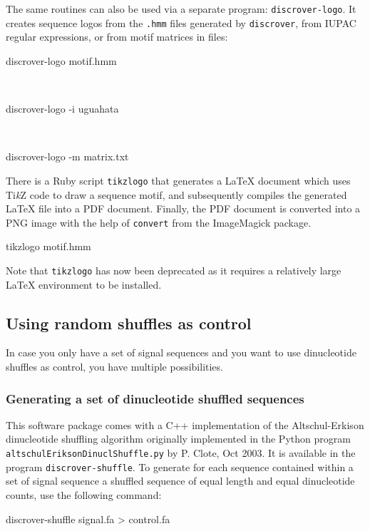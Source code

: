 \documentclass[a4paper]{article}
\newcommand{\dinuclshuffle}[0]{\texttt{discrover-shuffle}}
\newcommand{\TikZ}{Ti\emph{k}Z}
\begin{document}
The same routines can also be used via a separate program: \verb|discrover-logo|.
It creates sequence logos from the \verb|.hmm| files generated by \verb|discrover|, from IUPAC regular expressions, or from motif matrices in files:\\
\begin{verbbox}
discrover-logo motif.hmm
\end{verbbox}
\fbox{\theverbbox[t]}\\
\begin{verbbox}
discrover-logo -i uguahata
\end{verbbox}
\fbox{\theverbbox[t]}\\
\begin{verbbox}
discrover-logo -m matrix.txt
\end{verbbox}
\fbox{\theverbbox[t]}

There is a Ruby script \verb|tikzlogo| that generates a \LaTeX{} document which uses \TikZ{} code to draw a sequence motif, and subsequently compiles the generated \LaTeX{} file into a PDF document.
Finally, the PDF document is converted into a PNG image with the help of \verb|convert| from the ImageMagick package.\\
\begin{verbbox}
tikzlogo motif.hmm
\end{verbbox}
\fbox{\theverbbox[t]}

Note that \verb|tikzlogo| has now been deprecated as it requires a relatively large \LaTeX{} environment to be installed.

\subsection{Using random shuffles as control}
In case you only have a set of signal sequences and you want to use dinucleotide shuffles as control, you have multiple possibilities.
\subsubsection{Generating a set of dinucleotide shuffled sequences}
This software package comes with a C++ implementation of the Altschul-Erkison dinucleotide shuffling algorithm originally implemented in the Python program \verb|altschulEriksonDinuclShuffle.py| by P. Clote, Oct 2003.
It is available in the program \dinuclshuffle{}.
To generate for each sequence contained within a set of signal sequence a shuffled sequence of equal length and equal dinucleotide counts, use the following command:\\
\begin{verbbox}
discrover-shuffle signal.fa > control.fa
\end{verbbox}
\fbox{\theverbbox[t]}
\end{document}

